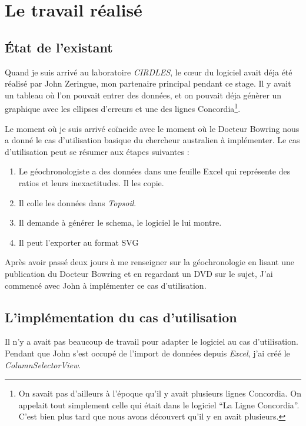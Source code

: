 ﻿\chapter{Le travail réalisé}

%
%
%
\section{État de l'existant}
Quand je suis arrivé au laboratoire \textit{CIRDLES}, le cœur du logiciel avait déja été réalisé par John Zeringue, mon partenaire principal pendant ce stage. Il y avait un tableau où l'on pouvait entrer des données, et on pouvait déja génèrer un graphique avec les ellipses d'erreurs et une des lignes Concordia\footnote{On savait pas d'ailleurs à l'époque qu'il y avait plusieurs lignes Concordia. On appelait tout simplement celle qui était dans le logiciel ``La Ligne Concordia''. C'est bien plus tard que nous avons découvert qu'il y en avait plusieurs.}.

Le moment où je suis arrivé coïncide avec le moment où le Docteur Bowring nous a donné le cas d'utilisation basique du chercheur australien à implémenter. Le cas d'utilisation peut se résumer aux étapes suivantes :
\begin{enumerate}
\item Le géochronologiste a des données dans une feuille Excel qui représente des ratios et leurs inexactitudes. Il les copie.
\item Il colle les données dans \textit{Topsoil}.
\item Il demande à générer le schema, le logiciel le lui montre.
\item Il peut l'exporter au format SVG
\end{enumerate}

Après avoir passé deux jours à me renseigner sur la géochronologie en lisant une publication du Docteur Bowring et en regardant un DVD sur le sujet, %
J'ai commencé avec John à implémenter ce cas d'utilisation.

%
%
%
\section{L'implémentation du cas d'utilisation}
Il n'y a avait pas beaucoup de travail pour adapter le logiciel au cas d'utilisation. Pendant que John s'est occupé de l'import de données depuis \textit{Excel}, j'ai créé le \textit{ColumnSelectorView}.

